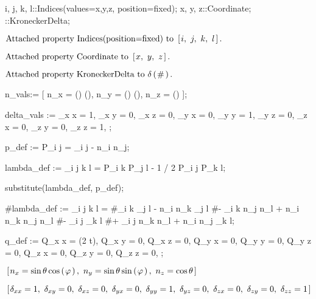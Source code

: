 \documentclass[10pt]{article}
\newcommand\brwrap[3]{%
  \setbox0=\hbox{$#2$}
  \left#1\vbox to \the\ht0{\hbox to 0pt{}}\right.\kern-.2em
  \begingroup #2\endgroup\kern-.15em
  \left.\vbox to \the\ht0{\hbox to 0pt{}}\right#3
}
\begin{document}
\begin{python}
{i, j, k, l}::Indices(values={x,y,z}, position=fixed);
{x, y, z}::Coordinate;
{\delta{#}}::KroneckerDelta;
\end{python}
\begin{adjustwidth}{1em}{0cm}${}\text{Attached property Indices(position=fixed) to~}\brwrap{[}{i,~ j,~ k,~ l}{]}.$\end{adjustwidth}
\begin{adjustwidth}{1em}{0cm}${}\text{Attached property Coordinate to~}\brwrap{[}{x,~ y,~ z}{]}.$\end{adjustwidth}
\begin{adjustwidth}{1em}{0cm}${}\text{Attached property KroneckerDelta to~}\delta\brwrap{(}{\#}{)}.$\end{adjustwidth}
\begin{python}
n_vals:= [ n_x = \sin(\theta) \cos(\varphi),
      n_y = \sin(\theta) \sin(\varphi),
      n_z = \cos(\theta)
];

delta_vals := { \delta_{x x} = 1,
\delta_{x y} = 0,
\delta_{x z} = 0,
\delta_{y x} = 0,
\delta_{y y} = 1,
\delta_{y z} = 0,
\delta_{z x} = 0,
\delta_{z y} = 0,
\delta_{z z} = 1,
};

p_def := P_{i j} = \delta_{i j} - n_i n_j;

lambda_def := \Lambda_{i j k l} = P_{i k} P_{j l} - 1 / 2 P_{i j} P_{k l};

substitute(lambda_def, p_def);

#lambda_def := {\Lambda_{i j k l} = 
#\delta_{i k} \delta_{j l} - n_i n_k \delta_{j l} 
#- \delta_{i k} n_j n_l +  n_{i} n_k n_j n_l 
#-  \delta_{i j} \delta_{k l} 
#+  \delta_{i j} n_k n_l +  n_i n_j \delta_{k l}};

q_def := { Q_{x x} = \cos(2 \omega t),
Q_{x y} = 0,
Q_{x z} = 0,
Q_{y x} = 0,
Q_{y y} = 0,
Q_{y z} = 0,
Q_{z x} = 0,
Q_{z y} = 0,
Q_{z z} = 0,
};
\end{python}
\begin{adjustwidth}{1em}{0cm}${}\brwrap{[}{n_{x} = \sin{\theta} \cos\brwrap{(}{\varphi}{)},~ n_{y} = \sin{\theta} \sin\brwrap{(}{\varphi}{)},~ n_{z} = \cos{\theta}}{]}$\end{adjustwidth}
\begin{adjustwidth}{1em}{0cm}${}\brwrap{[}{\delta_{x x} = 1,~ \delta_{x y} = 0,~ \delta_{x z} = 0,~ \delta_{y x} = 0,~ \delta_{y y} = 1,~ \delta_{y z} = 0,~ \delta_{z x} = 0,~ \delta_{z y} = 0,~ \delta_{z z} = 1}{]}$\end{adjustwidth}
\end{document}
